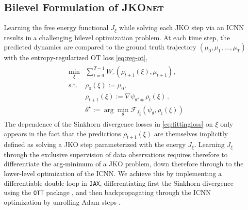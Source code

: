 \subsection{Bilevel Formulation of \textsc{JKOnet}}
Learning the free energy functional $J_\xi$ while solving each \acrshort{JKO} step via an ICNN results in a challenging bilevel optimization problem.
At each time step, the predicted dynamics are compared to the ground truth trajectory $(\mu_0, \mu_1, \dots, \mu_T)$ with the entropy-regularized OT loss \eqref{eq:reg-ot},
\begin{align} \label{eq:fittingloss}
\begin{split}
    \min_\xi & \sum_{t=0}^{T-1} W_\varepsilon(\rho_{t+1}(\xi), \mu_{t+1}), \\
    \text{s.t. } & \rho_{0}(\xi) := \mu_0, \\
      & \rho_{t+1}(\xi) := \nabla \psi_{\theta^\star\, \#}\, \rho_{t}(\xi)\,, \\
      & \theta^\star:=\arg \min_{\theta} \mathcal{F}_{J_{\xi}}(\psi_{\theta},\rho_t(\xi))
\end{split}
\end{align}
The dependence of the Sinkhorn divergence losses in \eqref{eq:fittingloss} on $\xi$ only appears in the fact that the predictions $\rho_{t+1}(\xi)$ are themselves implicitly defined as solving a \acrshort{JKO} step parameterized with the energy $J_\xi$. 
Learning  $J_\xi$ through the exclusive supervision of data observations requires therefore to differentiate the arg-minimum of a \acrshort{JKO} problem, down therefore through to the lower-level optimization of the ICNN. We achieve this by implementing a differentiable double loop in \texttt{JAX}, differentiating first the Sinkhorn divergence using the \texttt{OTT} package \citep{cuturi2022optimal}, and then backpropagating through the ICNN optimization by unrolling Adam steps \citep{kingma2014adam, metz2016unrolled, lorraine2020optimizing}.


